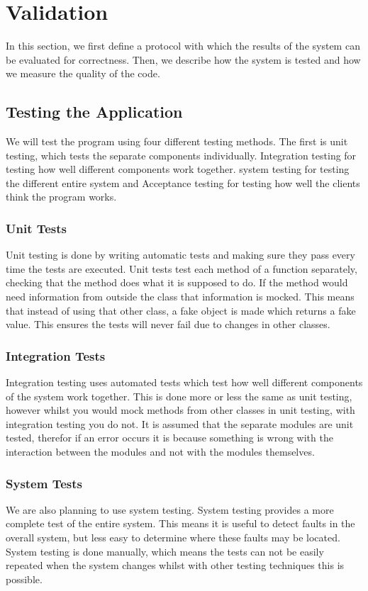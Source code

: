 \section{Validation}
In this section, we first define a protocol with which the results of the system can be evaluated for correctness. Then, we describe how the system is tested and how we measure the quality of the code.

\subsection{Testing the Application}
We will test the program using four different testing methods. The first is unit testing, which tests the separate components individually. Integration testing for testing how well different components work together. system testing for testing the different entire system and Acceptance testing for testing how well the clients think the program works.

\subsubsection{Unit Tests}
Unit testing is done by writing automatic tests and making sure they pass every time the tests are executed. Unit tests test each method of a function separately, checking that the method does what it is supposed to do. If the method would need information from outside the class that information is mocked. This means that instead of using that other class, a fake object is made which returns a fake value. This ensures the tests will never fail due to changes in other classes.

\subsubsection{Integration Tests}
Integration testing uses automated tests which test how well different components of the system work together. This is done more or less the same as unit testing, however whilst you would mock methods from other classes in unit testing, with integration testing you do not. It is assumed that the separate modules are unit tested, therefor if an error occurs it is because something is wrong with the interaction between the modules and not with the modules themselves. 

\subsubsection{System Tests}
We are also planning to use system testing. System testing provides a more complete test of the entire system. This means it is useful to detect faults in the overall system, but less easy to determine where these faults may be located. System testing is done manually, which means the tests can not be easily repeated when the system changes whilst with other testing techniques this is possible.

